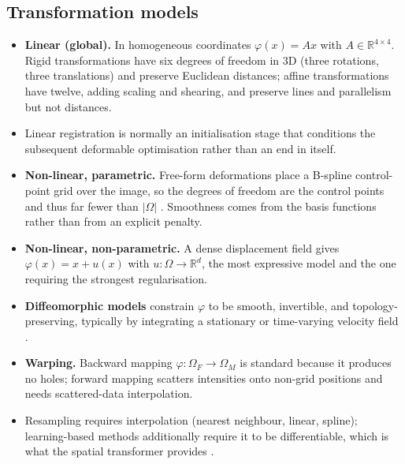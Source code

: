 \subsection{Transformation models}
\begin{itemize}
\item \textbf{Linear (global).} In homogeneous coordinates $\varphi(x) = Ax$ with $A \in \mathbb{R}^{4\times4}$. Rigid transformations have six degrees of freedom in 3D (three rotations, three translations) and preserve Euclidean distances; affine transformations have twelve, adding scaling and shearing, and preserve lines and parallelism but not distances.
\item Linear registration is normally an initialisation stage that conditions the subsequent deformable optimisation rather than an end in itself.
\item \textbf{Non-linear, parametric.} Free-form deformations place a B-spline control-point grid over the image, so the degrees of freedom are the control points and thus far fewer than $|\Omega|$ \citep{rueckert1999nonrigid}. Smoothness comes from the basis functions rather than from an explicit penalty.
\item \textbf{Non-linear, non-parametric.} A dense displacement field gives $\varphi(x) = x + u(x)$ with $u : \Omega \to \mathbb{R}^d$, the most expressive model and the one requiring the strongest regularisation.
\item \textbf{Diffeomorphic models} constrain $\varphi$ to be smooth, invertible, and topology-preserving, typically by integrating a stationary or time-varying velocity field \citep{chen2025survey}.
\item \textbf{Warping.} Backward mapping $\varphi : \Omega_F \to \Omega_M$ is standard because it produces no holes; forward mapping scatters intensities onto non-grid positions and needs scattered-data interpolation.
\item Resampling requires interpolation (nearest neighbour, linear, spline); learning-based methods additionally require it to be differentiable, which is what the spatial transformer provides \citep{jaderberg2015spatial}.
\end{itemize}

